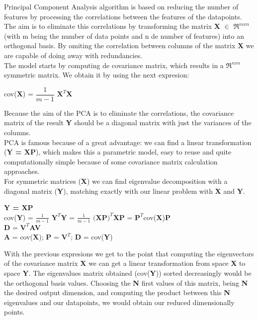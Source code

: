 \documentclass[a4paper,11pt,spanish]{report}
\begin{document}
Principal Component Analysis algorithm is based on reducing the number of features by processing the correlations between the features of the datapoints. The aim is to eliminate this correlations by transforming the matrix \textbf{X} $\in$ $\Re^{mxn}$ (with m being the number of data points and n de number of features) into an orthogonal basis. By omiting the correlation between columns of the matrix \textbf{X} we are capable of doing away with redundancies.\\
The model starts by computing de covariance matrix, which results in a $\Re^{nxn}$ symmetric matrix. We obtain it by using the next expresion:
\begin{center}
cov(\textbf{X}) = $\dfrac{1}{m-1}$ $\textbf{X}^{T}$\textbf{X}
\end{center}
Because the aim of the PCA is to eliminate the correlations, the covariance matrix of the result \textbf{Y} should be a diagonal matrix with just the variances of the columns.\\
PCA is famous because of a great advantage: we can find a linear transformation (\textbf{Y = XP}), which makes this a parametric model, easy to reuse and quite computationally simple because of some covariance matrix calculation approaches.\\
For symmetric matrices (\textbf{X}) we can find eigenvalue decomposition with a diagonal matrix (\textbf{Y}), matching exactly with our linear problem with \textbf{X} and \textbf{Y}.
\begin{center}
\textbf{Y = XP}\\
cov(\textbf{Y}) = $\frac{1}{m-1}$ $\textbf{Y}^{T}$\textbf{Y} = $\frac{1}{m-1}$ $\textbf{(XP)}^{T}$\textbf{XP} = $\textbf{P}^{T}$cov(\textbf{X})\textbf{P}\\
\textbf{D} = $\textbf{V}^{T}$\textbf{AV}\\
\textbf{A} = cov(\textbf{X}); \textbf{P} = $\textbf{V}^{T}$; \textbf{D} = cov(\textbf{Y})
\end{center}
With the previous expresions we get to the point that computing the eigenvectors of the covariance matrix \textbf{X} we can get a linear transformation from space \textbf{X} to space \textbf{Y}. The eigenvalues matrix obtained (cov(\textbf{Y})) sorted decreasingly would be the orthogonal basis values. Choosing the \textbf{N} first values of this matrix, being \textbf{N} the desired output dimension, and computing the product between this \textbf{N} eigenvalues and our datapoints, we would obtain our reduced dimensionally points.
\newpage
\end{document}
